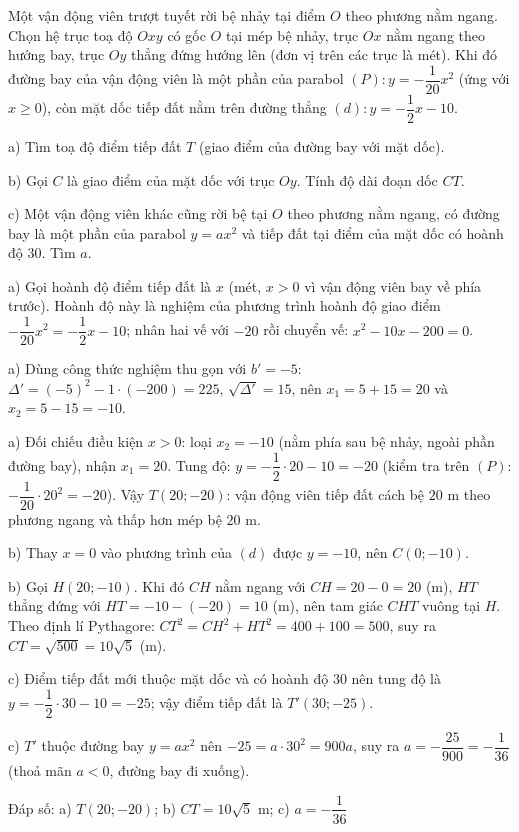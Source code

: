 \begin{problem}[9DS-HSB2-030]
Một vận động viên trượt tuyết rời bệ nhảy tại điểm $O$ theo phương nằm ngang. Chọn hệ trục toạ độ $Oxy$ có gốc $O$ tại mép bệ nhảy, trục $Ox$ nằm ngang theo hướng bay, trục $Oy$ thẳng đứng hướng lên (đơn vị trên các trục là mét). Khi đó đường bay của vận động viên là một phần của parabol $(P)\colon y = -\dfrac{1}{20}x^2$ (ứng với $x \geq 0$), còn mặt dốc tiếp đất nằm trên đường thẳng $(d)\colon y = -\dfrac{1}{2}x - 10$.

a) Tìm toạ độ điểm tiếp đất $T$ (giao điểm của đường bay với mặt dốc).

b) Gọi $C$ là giao điểm của mặt dốc với trục $Oy$. Tính độ dài đoạn dốc $CT$.

c) Một vận động viên khác cũng rời bệ tại $O$ theo phương nằm ngang, có đường bay là một phần của parabol $y = ax^2$ và tiếp đất tại điểm của mặt dốc có hoành độ $30$. Tìm $a$.

\begin{solution}
a) Gọi hoành độ điểm tiếp đất là $x$ (mét, $x > 0$ vì vận động viên bay về phía trước). Hoành độ này là nghiệm của phương trình hoành độ giao điểm $-\dfrac{1}{20}x^2 = -\dfrac{1}{2}x - 10$; nhân hai vế với $-20$ rồi chuyển vế: $x^2 - 10x - 200 = 0$.

a) Dùng công thức nghiệm thu gọn với $b' = -5$: $\Delta' = (-5)^2 - 1 \cdot (-200) = 225$, $\sqrt{\Delta'} = 15$, nên $x_1 = 5 + 15 = 20$ và $x_2 = 5 - 15 = -10$.

a) Đối chiếu điều kiện $x > 0$: loại $x_2 = -10$ (nằm phía sau bệ nhảy, ngoài phần đường bay), nhận $x_1 = 20$. Tung độ: $y = -\dfrac{1}{2} \cdot 20 - 10 = -20$ (kiểm tra trên $(P)$: $-\dfrac{1}{20} \cdot 20^2 = -20$). Vậy $T(20; -20)$: vận động viên tiếp đất cách bệ $20$ m theo phương ngang và thấp hơn mép bệ $20$ m.

b) Thay $x = 0$ vào phương trình của $(d)$ được $y = -10$, nên $C(0; -10)$.

b) Gọi $H(20; -10)$. Khi đó $CH$ nằm ngang với $CH = 20 - 0 = 20$ (m), $HT$ thẳng đứng với $HT = -10 - (-20) = 10$ (m), nên tam giác $CHT$ vuông tại $H$. Theo định lí Pythagore: $CT^2 = CH^2 + HT^2 = 400 + 100 = 500$, suy ra $CT = \sqrt{500} = 10\sqrt{5}$ (m).

c) Điểm tiếp đất mới thuộc mặt dốc và có hoành độ $30$ nên tung độ là $y = -\dfrac{1}{2} \cdot 30 - 10 = -25$; vậy điểm tiếp đất là $T'(30; -25)$.

c) $T'$ thuộc đường bay $y = ax^2$ nên $-25 = a \cdot 30^2 = 900a$, suy ra $a = -\dfrac{25}{900} = -\dfrac{1}{36}$ (thoả mãn $a < 0$, đường bay đi xuống).

Đáp số: a) $\boxed{T(20; -20)}$; b) $\boxed{CT = 10\sqrt{5} \text{ m}}$; c) $\boxed{a = -\dfrac{1}{36}}$
\end{solution}
\end{problem}

